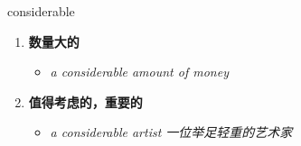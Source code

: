
\begin{frame}
{\huge considerable}
\begin{center}
\begin{enumerate}\Large
  \item \textbf{数量大的}
  \begin{itemize}
    \item \em{\Large{a considerable amount of money}}
  \end{itemize}
  \item \textbf{值得考虑的，重要的}
  \begin{itemize}
    \item \em{\Large{a considerable artist 一位举足轻重的艺术家}}
  \end{itemize}
\end{enumerate}
\end{center}
\end{frame}

